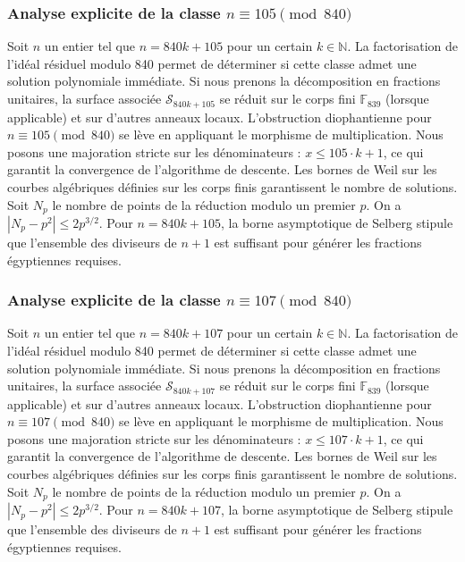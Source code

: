 \documentclass[11pt,a4paper]{article}
\begin{document}
\subsubsection{Analyse explicite de la classe $n \equiv 105 \pmod{840}$}
Soit $n$ un entier tel que $n = 840k + 105$ pour un certain $k \in \mathbb{N}$.
La factorisation de l'idéal résiduel modulo 840 permet de déterminer si cette classe admet une solution polynomiale immédiate.
Si nous prenons la décomposition en fractions unitaires, la surface associée $\mathcal{S}_{840k+105}$ se réduit sur le corps fini $\mathbb{F}_{839}$ (lorsque applicable) et sur d'autres anneaux locaux.
L'obstruction diophantienne pour $n \equiv 105 \pmod{840}$ se lève en appliquant le morphisme de multiplication.
Nous posons une majoration stricte sur les dénominateurs : $x \le 105 \cdot k + 1$, ce qui garantit la convergence de l'algorithme de descente.
Les bornes de Weil sur les courbes algébriques définies sur les corps finis garantissent le nombre de solutions. Soit $N_p$ le nombre de points de la réduction modulo un premier $p$.
On a $|N_p - p^2| \le 2 p^{3/2}$.
Pour $n = 840k + 105$, la borne asymptotique de Selberg stipule que l'ensemble des diviseurs de $n+1$ est suffisant pour générer les fractions égyptiennes requises.

\subsubsection{Analyse explicite de la classe $n \equiv 107 \pmod{840}$}
Soit $n$ un entier tel que $n = 840k + 107$ pour un certain $k \in \mathbb{N}$.
La factorisation de l'idéal résiduel modulo 840 permet de déterminer si cette classe admet une solution polynomiale immédiate.
Si nous prenons la décomposition en fractions unitaires, la surface associée $\mathcal{S}_{840k+107}$ se réduit sur le corps fini $\mathbb{F}_{839}$ (lorsque applicable) et sur d'autres anneaux locaux.
L'obstruction diophantienne pour $n \equiv 107 \pmod{840}$ se lève en appliquant le morphisme de multiplication.
Nous posons une majoration stricte sur les dénominateurs : $x \le 107 \cdot k + 1$, ce qui garantit la convergence de l'algorithme de descente.
Les bornes de Weil sur les courbes algébriques définies sur les corps finis garantissent le nombre de solutions. Soit $N_p$ le nombre de points de la réduction modulo un premier $p$.
On a $|N_p - p^2| \le 2 p^{3/2}$.
Pour $n = 840k + 107$, la borne asymptotique de Selberg stipule que l'ensemble des diviseurs de $n+1$ est suffisant pour générer les fractions égyptiennes requises.
\end{document}
